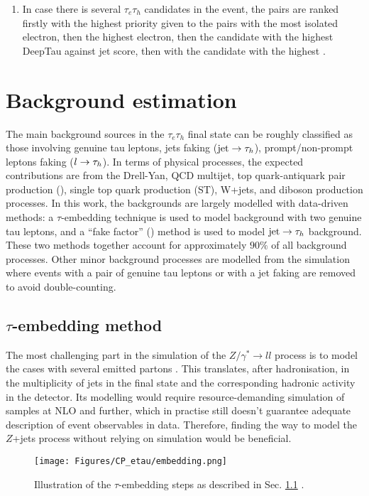 \begin{enumerate}
    \item In case there is several $\tau_e\tau_h$ candidates in the event, the pairs are ranked firstly with the highest priority given to the pairs with the most isolated electron, then the highest \pt electron, then the \tauh candidate with the highest DeepTau against jet score, then with the \tauh candidate with the highest \pt.
\end{enumerate}


\section{Background estimation}\label{sec:bkgr}
The main background sources in the $\tau_e\tau_h$ final state can be roughly classified as those involving genuine tau leptons, jets faking \tauh ($\text{jet}\to \tau_h$), prompt/non-prompt leptons faking \tauh ($l\to \tau_h$). In terms of physical processes, the expected contributions are from the Drell-Yan, QCD multijet, top
quark-antiquark pair production (\ttbar), single top quark production (ST), W+jets, and diboson production processes. In this work, the backgrounds are largely modelled with data-driven methods: a $\tau$-embedding technique \cite{CMS:2019pkt} is used to model background with two genuine tau leptons, and a \enquote{fake factor} (\ff) method \cite{CMS:2018lkr} is used to model $\text{jet}\to \tau_h$ background. These two methods together account for approximately $90\%$ of all background processes. Other minor background processes are modelled from the simulation where events with a pair of genuine tau leptons or with a jet faking \tauh are removed to avoid double-counting. 

\subsection{$\tau$-embedding method}\label{sec:emb}
The most challenging part in the simulation of the $Z/\gamma^* \to ll$ process is to model the cases with several emitted partons . This translates, after hadronisation, in the multiplicity of jets in the final state and the corresponding hadronic activity in the detector. Its modelling would require resource-demanding simulation of samples at NLO and further, which in practise still doesn't guarantee adequate description of event observables in data. Therefore, finding the way to model the $Z$+jets process without relying on simulation would be beneficial. 

\begin{figure}[t!]
    \centering
    \texttt{[image: Figures/CP\_etau/embedding.png]}
    \caption{Illustration of the $\tau$-embedding steps as described in Sec. \ref{sec:emb} \cite{CMS:2019pkt}.}
    \label{fig:emb}
\end{figure}

